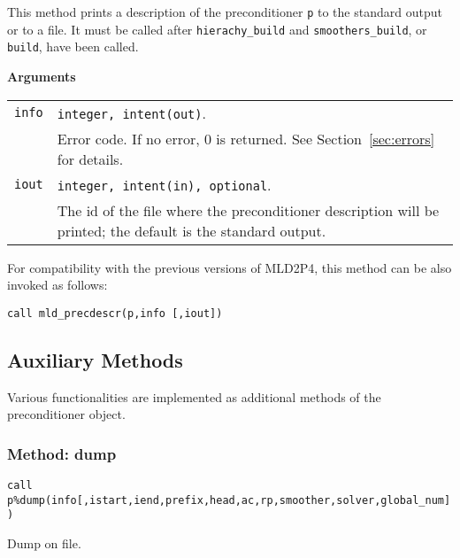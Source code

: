 \noindent
This method prints a description of the preconditioner \verb|p| to the standard output or
to a file. It must be called after \verb|hierachy_build| and \verb|smoothers_build|,
or \verb|build|, have been called.

{\baselineskip\noindent\large\bfseries Arguments} \smallskip

\begin{tabular}{p{1.2cm}p{12cm}}
\verb|info|   & \verb|integer, intent(out)|.\\
              & Error code. If no error, 0 is returned. See Section~\ref{sec:errors} for details.\\
\verb|iout|   & \verb|integer, intent(in), optional|.\\
              & The id of the file where the preconditioner description
                will be printed; the default is the standard output.\\
\end{tabular}

\baselineskip
For compatibility with the previous versions of MLD2P4, this method can be also invoked
as follows:

\begin{center}
\verb|call mld_precdescr(p,info [,iout])|
\end{center}


\subsection{Auxiliary Methods\label{sec:auxil}}
Various functionalities are implemented as additional methods of the
preconditioner object. 

\subsubsection{Method: dump}
  
\begin{center}
\verb|call p%dump(info[,istart,iend,prefix,head,ac,rp,smoother,solver,global_num])|\\
\end{center}

\noindent
Dump on file.

